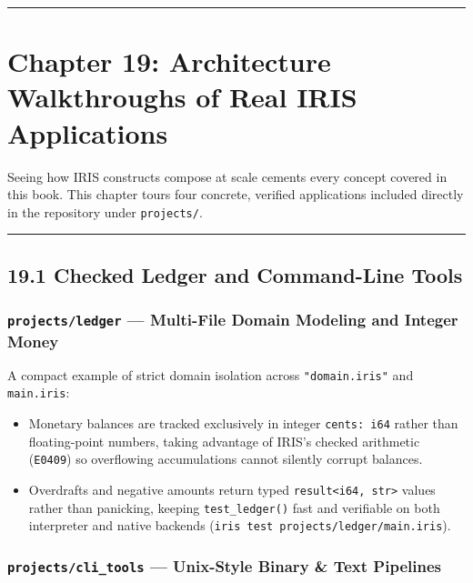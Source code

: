 \documentclass[
  english,
  oneside]{book}
\providecommand{\tightlist}{%
  \setlength{\itemsep}{0pt}\setlength{\parskip}{0pt}}
\begin{document}
\begin{center}\rule{0.5\linewidth}{0.5pt}\end{center}

\chapter{Chapter 19: Architecture Walkthroughs of Real IRIS
Applications}\label{chapter-19-architecture-walkthroughs-of-real-iris-applications}

Seeing how IRIS constructs compose at scale cements every concept
covered in this book. This chapter tours four concrete, verified
applications included directly in the repository under
\texttt{projects/}.

\begin{center}\rule{0.5\linewidth}{0.5pt}\end{center}

\section{19.1 Checked Ledger and Command-Line
Tools}\label{checked-ledger-and-command-line-tools}

\subsection{\texorpdfstring{\texttt{projects/ledger} --- Multi-File
Domain Modeling and Integer
Money}{projects/ledger --- Multi-File Domain Modeling and Integer Money}}\label{projectsledger-multi-file-domain-modeling-and-integer-money}

A compact example of strict domain isolation across
\texttt{"domain.iris"} and \texttt{main.iris}:

\begin{itemize}
\tightlist
\item
  Monetary balances are tracked exclusively in integer
  \texttt{cents:\ i64} rather than floating-point numbers, taking
  advantage of IRIS's checked arithmetic (\texttt{E0409}) so overflowing
  accumulations cannot silently corrupt balances.
\item
  Overdrafts and negative amounts return typed
  \texttt{result\textless{}i64,\ str\textgreater{}} values rather than
  panicking, keeping \texttt{test\_ledger()} fast and verifiable on both
  interpreter and native backends
  (\texttt{iris\ test\ projects/ledger/main.iris}).
\end{itemize}

\subsection{\texorpdfstring{\texttt{projects/cli\_tools} --- Unix-Style
Binary \& Text
Pipelines}{projects/cli\_tools --- Unix-Style Binary \& Text Pipelines}}\label{projectscli_tools-unix-style-binary-text-pipelines}
\end{document}
